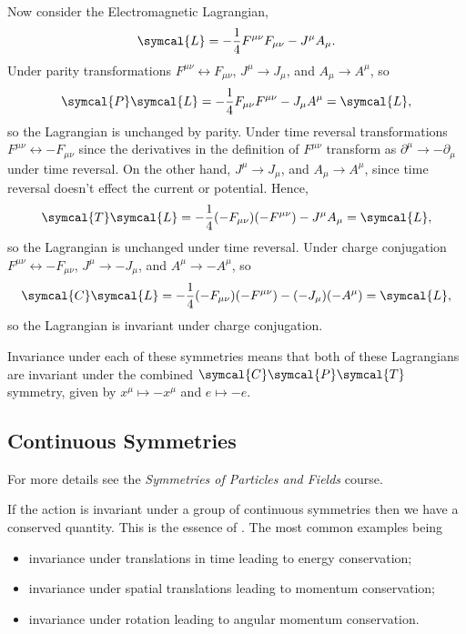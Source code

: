 \documentclass[fleqn]{NotesClass}
\newcommand*{\course}[1]{\textit{#1}}
\newcommand{\lagrangianDensity}{\symcal{L}}
\newcommand{\parity}{\symcal{P}}
\newcommand{\chargeConjugation}{\symcal{C}}
\newcommand{\timeReversal}{\symcal{T}}
\begin{document}
    Now consider the Electromagnetic Lagrangian,
    \begin{equation}
        \lagrangianDensity = -\frac{1}{4}F^{\mu\nu}F_{\mu\nu} - J^\mu A_\mu.
    \end{equation}
    Under parity transformations \(F^{\mu\nu} \leftrightarrow F_{\mu\nu}\), \(J^\mu \to J_\mu\), and \(A_\mu \to A^\mu\), so
    \begin{equation}
        \parity\lagrangianDensity = -\frac{1}{4}F_{\mu\nu}F^{\mu\nu} - J_\mu A^\mu = \lagrangianDensity,
    \end{equation}
    so the Lagrangian is unchanged by parity.
    Under time reversal transformations \(F^{\mu\nu} \leftrightarrow -F_{\mu\nu}\) since the derivatives in the definition of \(F^{\mu\nu}\) transform as \(\partial^\mu \to -\partial_\mu\) under time reversal.
    On the other hand, \(J^\mu \to J_\mu\), and \(A_\mu \to A^\mu\), since time reversal doesn't effect the current or potential.
    Hence,
    \begin{equation}
        \timeReversal\lagrangianDensity = -\frac{1}{4}(-F_{\mu\nu})(-F^{\mu\nu}) - J^\mu A_\mu = \lagrangianDensity,
    \end{equation}
    so the Lagrangian is unchanged under time reversal.
    Under charge conjugation \(F^{\mu\nu} \leftrightarrow -F_{\mu\nu}\), \(J^\mu \to -J_\mu\), and \(A^\mu \to -A^\mu\), so
    \begin{equation}
        \chargeConjugation\lagrangianDensity = -\frac{1}{4}(-F_{\mu\nu})(-F^{\mu\nu}) - (-J_\mu)(-A^\mu) = \lagrangianDensity,
    \end{equation}
    so the Lagrangian is invariant under charge conjugation.
    
    Invariance under each of these symmetries means that both of these Lagrangians are invariant under the combined \(\chargeConjugation\parity\timeReversal\) symmetry, given by \(x^\mu \mapsto -x^\mu\) and \(e \mapsto -e\).
    
    \subsection{Continuous Symmetries}
    \begin{rmk}
        For more details see the \course{Symmetries of Particles and Fields} course.
    \end{rmk}
    If the action is invariant under a group of continuous symmetries then we have a conserved quantity.
    This is the essence of .
    The most common examples being
    \begin{itemize}
        \item invariance under translations in time leading to energy conservation;
        \item invariance under spatial translations leading to momentum conservation;
        \item invariance under rotation leading to angular momentum conservation.
    \end{itemize}
    
\end{document}
